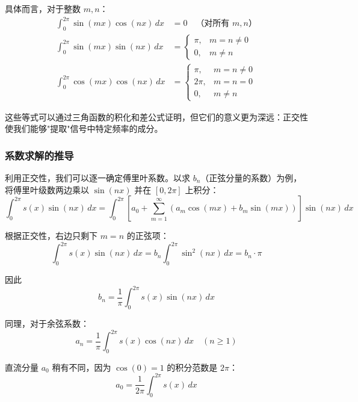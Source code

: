 具体而言，对于整数 $m, n$：
\begin{align}
    \int_0^{2\pi} \sin(mx) \cos(nx) \, dx &= 0 \quad \text{（对所有 $m, n$）} \\
    \int_0^{2\pi} \sin(mx) \sin(nx) \, dx &= \begin{cases} \pi, & m = n \neq 0 \\ 0, & m \neq n \end{cases} \\
    \int_0^{2\pi} \cos(mx) \cos(nx) \, dx &= \begin{cases} \pi, & m = n \neq 0 \\ 2\pi, & m = n = 0 \\ 0, & m \neq n \end{cases}
\end{align}

这些等式可以通过三角函数的积化和差公式证明，但它们的意义更为深远：正交性使我们能够"提取"信号中特定频率的成分。

\subsubsection{系数求解的推导}

利用正交性，我们可以逐一确定傅里叶系数。以求 $b_n$（正弦分量的系数）为例，将傅里叶级数两边乘以 $\sin(nx)$ 并在 $[0, 2\pi]$ 上积分：
\begin{equation}
    \int_0^{2\pi} s(x) \sin(nx) \, dx = \int_0^{2\pi} \left[ a_0 + \sum_{m=1}^{\infty} (a_m \cos(mx) + b_m \sin(mx)) \right] \sin(nx) \, dx
\end{equation}

根据正交性，右边只剩下 $m=n$ 的正弦项：
\begin{equation}
    \int_0^{2\pi} s(x) \sin(nx) \, dx = b_n \int_0^{2\pi} \sin^2(nx) \, dx = b_n \cdot \pi
\end{equation}

因此
\begin{equation}
    b_n = \frac{1}{\pi} \int_0^{2\pi} s(x) \sin(nx) \, dx
\end{equation}

同理，对于余弦系数：
\begin{equation}
    a_n = \frac{1}{\pi} \int_0^{2\pi} s(x) \cos(nx) \, dx \quad (n \geq 1)
\end{equation}

直流分量 $a_0$ 稍有不同，因为 $\cos(0) = 1$ 的积分范数是 $2\pi$：
\begin{equation}
    a_0 = \frac{1}{2\pi} \int_0^{2\pi} s(x) \, dx
\end{equation}

